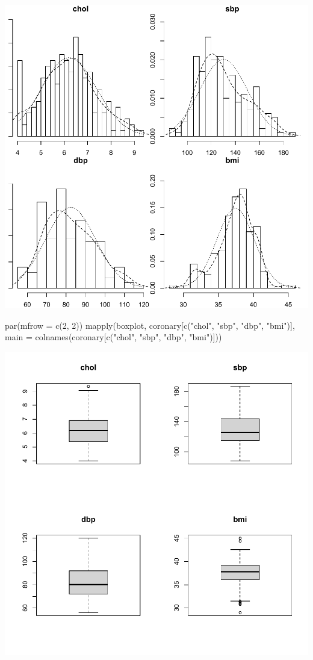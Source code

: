 \documentclass[
]{book}
\makeatletter
\newenvironment{Shaded}{\begin{snugshade}}{\end{snugshade}}
\newcommand{\AttributeTok}[1]{\textcolor[rgb]{0.61,0.61,0.61}{#1}}
\newcommand{\DecValTok}[1]{\textcolor[rgb]{0.06,0.06,0.06}{#1}}
\newcommand{\FunctionTok}[1]{\textcolor[rgb]{0,0,0}{#1}}
\newcommand{\NormalTok}[1]{#1}
\newcommand{\StringTok}[1]{\textcolor[rgb]{0.5,0.5,0.5}{#1}}
\newenvironment{kframe}{%
\medskip{}
\setlength{\fboxsep}{.8em}
 \def\at@end@of@kframe{}%
 \ifinner\ifhmode%
  \def\at@end@of@kframe{\end{minipage}}%
  \begin{minipage}{\columnwidth}%
 \fi\fi%
 \def\FrameCommand##1{\hskip\@totalleftmargin \hskip-\fboxsep
 \colorbox{shadecolor}{##1}\hskip-\fboxsep
     \hskip-\linewidth \hskip-\@totalleftmargin \hskip\columnwidth}%
 \MakeFramed {\advance\hsize-\width
   \@totalleftmargin\z@ \linewidth\hsize
   \@setminipage}}%
 {\par\unskip\endMakeFramed%
 \at@end@of@kframe}
\renewenvironment{Shaded}{\begin{kframe}}{\end{kframe}}
\makeatother
\begin{document}
\begin{center}\includegraphics[width=0.7\linewidth,keepaspectratio]{Multivariable_Data_Analysis_files/figure-latex/unnamed-chunk-109-2} \end{center}

\begin{Shaded}
\begin{Highlighting}[]
\FunctionTok{par}\NormalTok{(}\AttributeTok{mfrow =} \FunctionTok{c}\NormalTok{(}\DecValTok{2}\NormalTok{, }\DecValTok{2}\NormalTok{))}
\FunctionTok{mapply}\NormalTok{(boxplot, coronary[}\FunctionTok{c}\NormalTok{(}\StringTok{"chol"}\NormalTok{, }\StringTok{"sbp"}\NormalTok{, }\StringTok{"dbp"}\NormalTok{, }\StringTok{"bmi"}\NormalTok{)], }
       \AttributeTok{main =} \FunctionTok{colnames}\NormalTok{(coronary[}\FunctionTok{c}\NormalTok{(}\StringTok{"chol"}\NormalTok{, }\StringTok{"sbp"}\NormalTok{, }\StringTok{"dbp"}\NormalTok{, }\StringTok{"bmi"}\NormalTok{)]))}
\end{Highlighting}
\end{Shaded}

\begin{center}\includegraphics[width=0.7\linewidth,keepaspectratio]{Multivariable_Data_Analysis_files/figure-latex/unnamed-chunk-109-3} \end{center}
\end{document}
